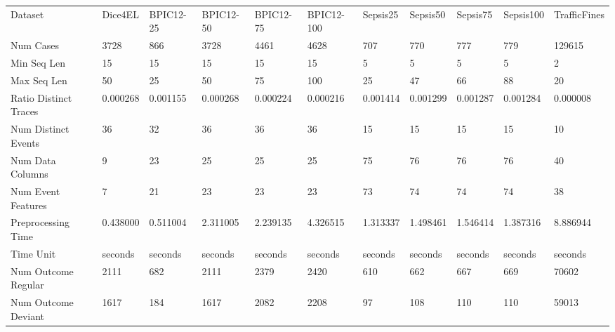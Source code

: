 \begin{tabular}{lllllllllll}
Dataset & Dice4EL & BPIC12-25 & BPIC12-50 & BPIC12-75 & BPIC12-100 & Sepsis25 & Sepsis50 & Sepsis75 & Sepsis100 & TrafficFines \\
Num Cases & 3728 & 866 & 3728 & 4461 & 4628 & 707 & 770 & 777 & 779 & 129615 \\
Min Seq Len & 15 & 15 & 15 & 15 & 15 & 5 & 5 & 5 & 5 & 2 \\
Max Seq Len & 50 & 25 & 50 & 75 & 100 & 25 & 47 & 66 & 88 & 20 \\
Ratio Distinct Traces & 0.000268 & 0.001155 & 0.000268 & 0.000224 & 0.000216 & 0.001414 & 0.001299 & 0.001287 & 0.001284 & 0.000008 \\
Num Distinct Events & 36 & 32 & 36 & 36 & 36 & 15 & 15 & 15 & 15 & 10 \\
Num Data Columns & 9 & 23 & 25 & 25 & 25 & 75 & 76 & 76 & 76 & 40 \\
Num Event Features & 7 & 21 & 23 & 23 & 23 & 73 & 74 & 74 & 74 & 38 \\
Preprocessing Time & 0.438000 & 0.511004 & 2.311005 & 2.239135 & 4.326515 & 1.313337 & 1.498461 & 1.546414 & 1.387316 & 8.886944 \\
Time Unit & seconds & seconds & seconds & seconds & seconds & seconds & seconds & seconds & seconds & seconds \\
Num Outcome Regular & 2111 & 682 & 2111 & 2379 & 2420 & 610 & 662 & 667 & 669 & 70602 \\
Num Outcome Deviant & 1617 & 184 & 1617 & 2082 & 2208 & 97 & 108 & 110 & 110 & 59013 \\
\end{tabular}
